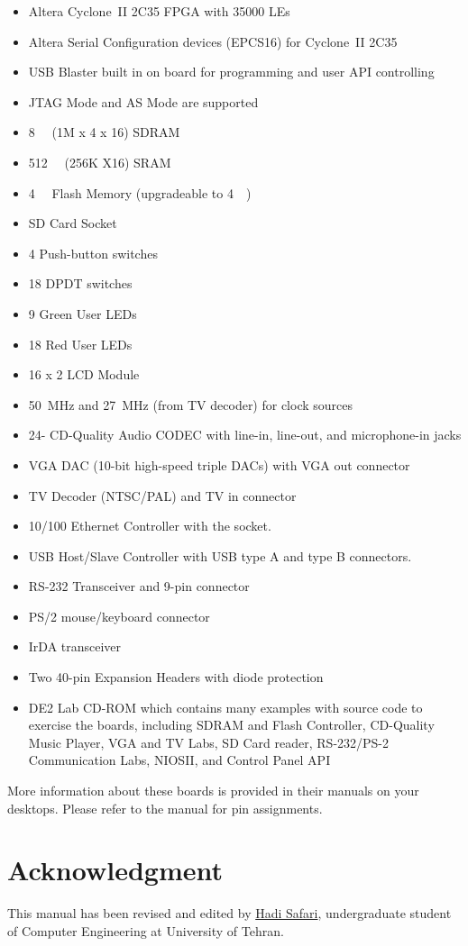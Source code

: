 \documentclass[12pt, logo=tehranDLDL/ut]{tehranDLDL}
\begin{document}
\begin{multicols}{2}
\begin{itemize}
    \item Altera Cyclone~II 2C35 FPGA with 35000 LEs
    \item Altera Serial Configuration devices (EPCS16) for Cyclone~II 2C35
    \item USB Blaster built in on board for programming and user API controlling
    \item JTAG Mode and AS Mode are supported
    \item \SI{8}{\mega\byte} (1M x 4 x 16) SDRAM
    \item \SI{512}{\kilo\byte} (256K X16) SRAM
    \item \SI{4}{\mega\byte} Flash Memory (upgradeable to \SI{4}{\mega\byte})
    \item SD Card Socket
    \item 4 Push-button switches
    \item 18 DPDT switches
    \item 9 Green User LEDs
    \item 18 Red User LEDs
    \item 16 x 2 LCD Module
    \item \SI{50}{\mega\hertz} and \SI{27}{\mega\hertz} (from TV decoder) for clock sources
    \item 24-\SI{}{\bit} CD-Quality Audio CODEC with line-in, line-out, and microphone-in jacks
    \item VGA DAC (10-bit high-speed triple DACs) with VGA out connector
    \item TV Decoder (NTSC/PAL) and TV in connector
    \item 10/100 Ethernet Controller with the socket.
    \item USB Host/Slave Controller with USB type A and type B connectors.
    \item RS-232 Transceiver and 9-pin connector
    \item PS/2 mouse/keyboard connector
    \item IrDA transceiver
    \item Two 40-pin Expansion Headers with diode protection
    \item DE2 Lab CD-ROM which contains many examples with source code to exercise the boards, including SDRAM and Flash Controller,  CD-Quality Music Player, VGA and TV Labs, SD Card reader, RS-232/PS-2 Communication Labs, NIOSII, and Control Panel API
\end{itemize}
\end{multicols}

More information about these boards is provided in their manuals on your desktops. Please refer to the manual for pin assignments. 

\section*{Acknowledgment}

This manual has been revised and edited by \href{mailto:hadi.safari@ut.ac.ir?subject=[DLDLab]\%20}{Hadi Safari}, undergraduate student of Computer Engineering at University of Tehran.
\end{document}

